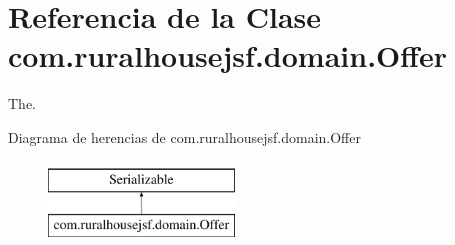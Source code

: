 \hypertarget{a00184}{}\section{Referencia de la Clase com.\+ruralhousejsf.\+domain.\+Offer}
\label{a00184}


The.  


Diagrama de herencias de com.\+ruralhousejsf.\+domain.\+Offer\begin{figure}[H]
\begin{center}
\leavevmode
\includegraphics[height=2.000000cm]{a00184}
\end{center}
\end{figure}
